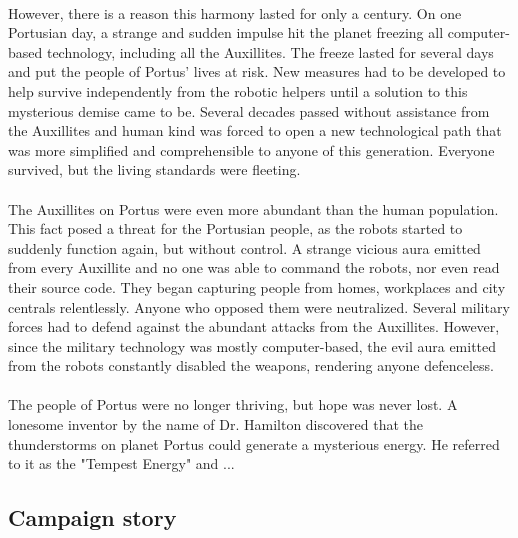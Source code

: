 \documentclass[../Main.tex]{subfiles}
\begin{document}
\paragraph{}
However, there is a reason this harmony lasted for only a century. On one Portusian day, a strange and sudden impulse hit the planet freezing all computer-based technology, including all the Auxillites. The freeze lasted for several days and put the people of Portus' lives at risk. New measures had to be developed to help survive independently from the robotic helpers until a solution to this mysterious demise came to be. Several decades passed without assistance from the Auxillites and human kind was forced to open a new technological path that was more simplified and comprehensible to anyone of this generation. Everyone survived, but the living standards were fleeting.

\paragraph{}
The Auxillites on Portus were even more abundant than the human population. This fact posed a threat for the Portusian people, as the robots started to suddenly function again, but without control. A strange vicious aura emitted from every Auxillite and no one was able to command the robots, nor even read their source code. They began capturing people from homes, workplaces and city centrals relentlessly. Anyone who opposed them were neutralized. Several military forces had to defend against the abundant attacks from the Auxillites. However, since the military technology was mostly computer-based, the evil aura emitted from the robots constantly disabled the weapons, rendering anyone defenceless. 

\paragraph{}
The people of Portus were no longer thriving, but hope was never lost. A lonesome inventor by the name of Dr. Hamilton discovered that the thunderstorms on planet Portus could generate a mysterious energy. He referred to it as the "Tempest Energy" and ...

\subsection{Campaign story}
\end{document}
